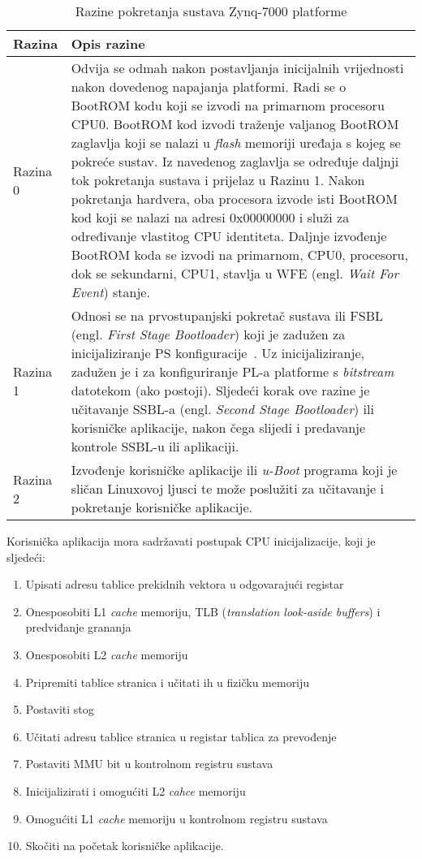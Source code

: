 \documentclass[times, utf8, diplomski, numeric]{fer}
\begin{document}
\begin{table}[H]
  \centering
  \caption{Razine pokretanja sustava Zynq-7000 platforme}
  \label{boot_stages}
  \begin{tabular}{|| p{2cm} | p{12cm} ||}
    \hline
    \textbf{Razina} & \textbf{Opis razine} \\
    \hline\hline
    Razina 0 & Odvija se odmah nakon postavljanja inicijalnih vrijednosti nakon dovedenog napajanja platformi.
    Radi se o BootROM kodu koji se izvodi na primarnom procesoru CPU0. BootROM kod izvodi traženje valjanog
    BootROM zaglavlja koji se nalazi u \textit{flash} memoriji uređaja s kojeg se pokreće sustav. Iz navedenog
    zaglavlja se određuje daljnji tok pokretanja sustava i prijelaz u Razinu 1. Nakon pokretanja hardvera, oba
    procesora izvode isti BootROM kod koji se nalazi na adresi 0x00000000 i služi za određivanje vlastitog
    CPU identiteta. Daljnje izvođenje BootROM koda se izvodi na primarnom, CPU0, procesoru, dok se sekundarni, CPU1,
    stavlja u WFE (engl. \textit{Wait For Event}) stanje.\\
    \hline
    Razina 1 & Odnosi se na prvostupanjski pokretač sustava ili FSBL (engl. \textit{First Stage Bootloader}) koji
    je zadužen za inicijaliziranje PS konfiguracije~\cite{zynq_swdg}. Uz inicijaliziranje, zadužen je i za konfiguriranje PL-a
    platforme s \textit{bitstream} datotekom (ako postoji). Sljedeći korak ove razine je učitavanje SSBL-a (engl.
    \textit{Second Stage Bootloader}) ili korisničke aplikacije, nakon čega slijedi i predavanje kontrole SSBL-u
    ili aplikaciji.\\
    \hline
    Razina 2 & Izvođenje korisničke aplikacije ili \textit{u-Boot} programa koji je sličan Linuxovoj ljusci te može
    poslužiti za učitavanje i pokretanje korisničke aplikacije.\\
    \hline
  \end{tabular}
\end{table}
\newpage
Korisnička aplikacija mora sadržavati postupak CPU inicijalizacije, koji je sljedeći:
\begin{enumerate}
  \item{Upisati adresu tablice prekidnih vektora u odgovarajući registar}
  \item{Onesposobiti L1 \textit{cache} memoriju, TLB (\textit{translation look-aside buffers}) i predviđanje grananja}
  \item{Onesposobiti L2 \textit{cache} memoriju}
  \item{Pripremiti tablice stranica i učitati ih u fizičku memoriju}
  \item{Postaviti stog}
  \item{Učitati adresu tablice stranica u registar tablica za prevođenje}
  \item{Postaviti MMU bit u kontrolnom registru sustava}
  \item{Inicijalizirati i omogućiti L2 \textit{cahce} memoriju}
  \item{Omogućiti L1 \textit{cache} memoriju u kontrolnom registru sustava}
  \item{Skočiti na početak korisničke aplikacije.}
\end{enumerate}
\end{document}
